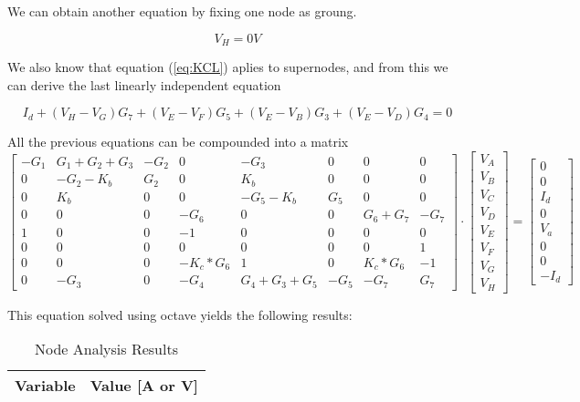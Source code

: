 We can obtain another equation by fixing one node as groung.

 \begin{equation}
  V_H = 0V
  \label{eq:supenodosGND}
\end{equation}

We also know that equation (\ref{eq:KCL}) aplies to supernodes, and from this we can derive the last linearly independent equation



 \begin{equation}
  I_d+(V_H-V_G)G_7+(V_E-V_F)G_5+(V_E-V_B)G_3+(V_E-V_D)G_4=0
  \label{eq:supenodosI}
\end{equation}

All the previous equations can be compounded into a matrix
  \begin{equation}\label{eq:matrixeqn2}
\begin{bmatrix}
    -G_1 & G_1+G_2+G_3 & -G_2 & 0 & -G_3 & 0 & 0 & 0\\
    0 & -G_2-K_b & G_2 & 0 & K_b & 0 & 0 & 0\\
    0 & K_b & 0 & 0 & -G_5-K_b & G_5 & 0 & 0\\
    0 & 0 & 0 & -G_6 & 0 & 0 & G_6+G_7 & -G_7\\
    1 & 0 & 0 & -1 & 0 & 0 & 0 & 0\\
    0 & 0 & 0 & 0 & 0 & 0 & 0 & 1\\
    0 & 0 & 0 & -K_c*G_6 & 1 & 0 & K_c*G_6 & -1\\
    0 & -G_3 & 0 & -G_4 & G_4+G_3+G_5 & -G_5 & -G_7 & G_7
\end{bmatrix}
\cdot
\begin{bmatrix}
V_A \\
V_B \\
V_C \\
V_D \\
V_E \\
V_F \\
V_G \\
V_H 
    \end{bmatrix}
=
    \begin{bmatrix}
0 \\
0 \\
I_d \\
0\\
V_a \\
0 \\
0 \\
-I_d
    \end{bmatrix}
  \end{equation}

This equation solved using octave yields the following results:

  \begin{table}[H]
    \centering
    \begin{tabular}{|l|r|}
      \hline    
      {\bf Variable} & {\bf Value [A or V]} \\ \hline
      
    \end{tabular}
    \caption{Node Analysis Results}
    \label{tab:nodeA}
  \end{table}
